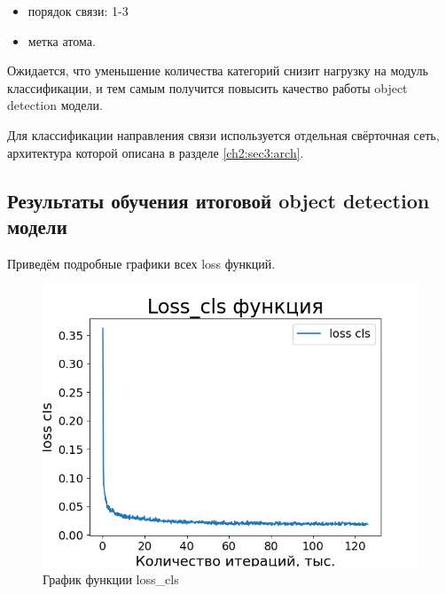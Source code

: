 \begin{itemize}
	\item порядок связи: 1-3
	\item метка атома.
\end{itemize}

Ожидается, что уменьшение количества категорий снизит нагрузку на модуль классификации, и тем самым получится повысить качество работы object detection модели.

Для классификации направления связи используется отдельная свёрточная сеть, архитектура которой описана в разделе \ref{ch2:sec3:arch}.


\subsection{Результаты обучения итоговой object detection модели}

Приведём подробные графики всех loss функций.

\begin{figure}[h!] 
	\center
	\includegraphics [scale=0.8] {my_folder/images/loss_cls_second}
	\caption{График функции loss\_cls}
	\label{fig:loss_cls}
\end{figure}

